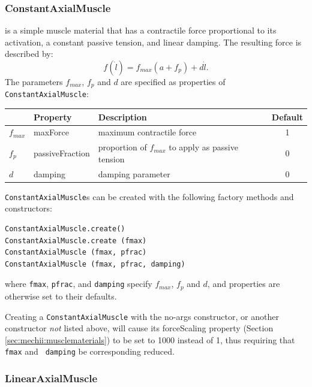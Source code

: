 \subsubsection{ConstantAxialMuscle}

is a simple muscle material that has a contractile force proportional
to its activation, a constant passive tension, and linear damping.
The resulting force is described by:
%
\begin{equation}
f(\dot l) = f_{max} ( a  +  f_{p} ) + d \dot l.
\label{ConstantAxialMaterial:eqn}
\end{equation}
%
The parameters $f_{max}$, $f_{p}$ and $d$ are specified as properties of
{\tt ConstantAxialMuscle}:

\begin{center}
\begin{tabular}{|l|l|l|c|} \hline
 & Property & Description & Default \\
\hline
$f_{max}$ & {\sf maxForce} & maximum contractile force & 1 \\
$f_{p}$ & {\sf passiveFraction} & 
proportion of $f_{max}$ to apply as passive tension & 0 \\
$d$ & {\sf damping} & damping parameter & 0 \\
\hline
\end{tabular}
\end{center}

{\tt ConstantAxialMuscle}s can be created with the following factory
methods and constructors:
\begin{lstlisting}[]
ConstantAxialMuscle.create()
ConstantAxialMuscle.create (fmax)
ConstantAxialMuscle (fmax, pfrac)
ConstantAxialMuscle (fmax, pfrac, damping)
\end{lstlisting}
%
where {\tt fmax}, {\tt pfrac}, and {\tt damping} specify $f_{max}$, $f_p$
and $d$, and properties are otherwise set to their defaults.

\begin{sideblock}
Creating a {\tt ConstantAxialMuscle} with the no-args constructor, or
another constructor {\it not} listed above, will cause its {\sf
forceScaling} property (Section \ref{sec:mechii:musclematerials}) to
be set to 1000 instead of 1, thus requiring that {\tt fmax} and {\tt
damping} be corresponding reduced.
\end{sideblock}

\subsubsection{LinearAxialMuscle}

